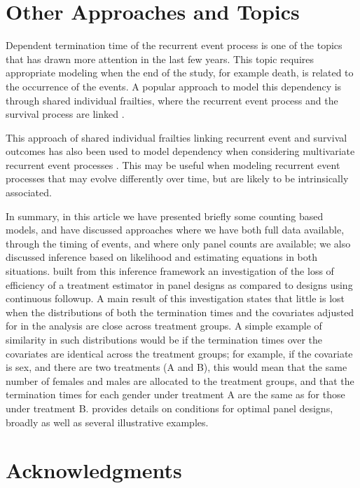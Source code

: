 \documentclass[12pt]{article}
\begin{document}
\section{Other Approaches and Topics}\label{sec:othermethods}

Dependent termination time of the recurrent event process is one of the topics that has drawn more attention in the last few years. This topic requires appropriate modeling when the end of the study, for example death, is related to the occurrence of the events. A popular approach to model this dependency is through shared individual frailties, where the recurrent event process and the survival process are linked  \citep{Liu:2004wz}. 

This approach of shared individual frailties linking recurrent event and survival outcomes has also been used to model dependency when considering multivariate recurrent event processes \citep{He:2008ts,Zhao:2012kf}. This may be useful when modeling recurrent event processes that may evolve differently over time, but are likely to be intrinsically associated.  


In summary, in this article we have presented briefly some counting based models, and have discussed approaches where we have both full data available, through the timing of events, and where only panel counts are available; we also discussed inference based on likelihood and estimating equations in both situations. \cite{juarez2013biost} built from this inference framework an investigation of the loss of efficiency of a treatment estimator in panel designs as compared to designs using continuous followup. A main result of this investigation states that little is lost when the distributions of both the termination times and the covariates adjusted for in the analysis are close across treatment groups. A simple example of similarity in such distributions would be if the termination times over the covariates are identical across the treatment groups; for example, if the covariate is sex, and there are two treatments (A and B), this would mean that the same number of females and males are allocated to the treatment groups, and that the termination times for each gender under treatment A are the same as for those under treatment B. \cite{juarez2013biost} provides details on conditions for optimal panel designs, broadly as well as several illustrative examples. 


\section*{Acknowledgments}
\end{document}
